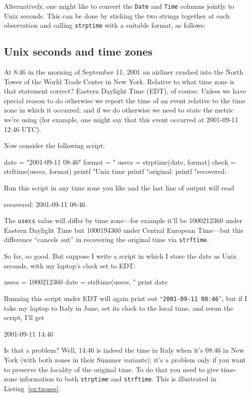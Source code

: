 Alternatively, one might like to convert the \texttt{Date} and
\texttt{Time} columns jointly to Unix seconds. This can be done by
sticking the two strings together at each observation and calling
\texttt{strptime} with a suitable format, as follows:
%

\subsection{Unix seconds and time zones}

At 8:46 in the morning of September 11, 2001 an airliner crashed into
the North Tower of the World Trade Center in New York. Relative to
what time zone is that statement correct? Eastern Daylight Time (EDT),
of course. Unless we have special reason to do otherwise we report the
time of an event relative to the time zone in which it occurred; and
if we do otherwise we need to state the metric we're using (for
example, one might say that this event occurred at 2001-09-11 12:46
UTC).

Now consider the following script:
%
\begin{code}
date = "2001-09-11 08:46"
format = "%
usecs = strptime(date, format)
check = strftime(usecs, format)
printf "Unix time %
printf "original:  %
printf "recovered: %
\end{code}

Run this script in any time zone you like and the last line of output
will read
\begin{code}
recovered: 2001-09-11 08:46
\end{code}
The \texttt{usecs} value will differ by time zone---for example it'll
be 1000212360 under Eastern Daylight Time but 1000194360 under Central
European Time---but this difference ``cancels out'' in recovering the
original time via \texttt{strftime}.

So far, so good. But suppose I write a script in which I store the
date as Unix seconds, with my laptop's clock set to EDT:
\begin{code}
usecs = 1000212360
date = strftime(usecs, "%
print date
\end{code}
Running this script under EDT will again print out
``\texttt{2001-09-11 08:46}'', but if I take my laptop to Italy in
June, set its clock to the local time, and rerun the script, I'll get
%
\begin{code}
2001-09-11 14:46
\end{code}
%
Is that a problem? Well, 14:46 is indeed the time in Italy when it's
08:46 in New York (with both zones in their Summer variants); it's a
problem only if you want to preserve the locality of the original
time. To do that you need to give time-zone information to both
\texttt{strptime} and \texttt{strftime}. This is illustrated in
Listing~\ref{ex:tzones}.

